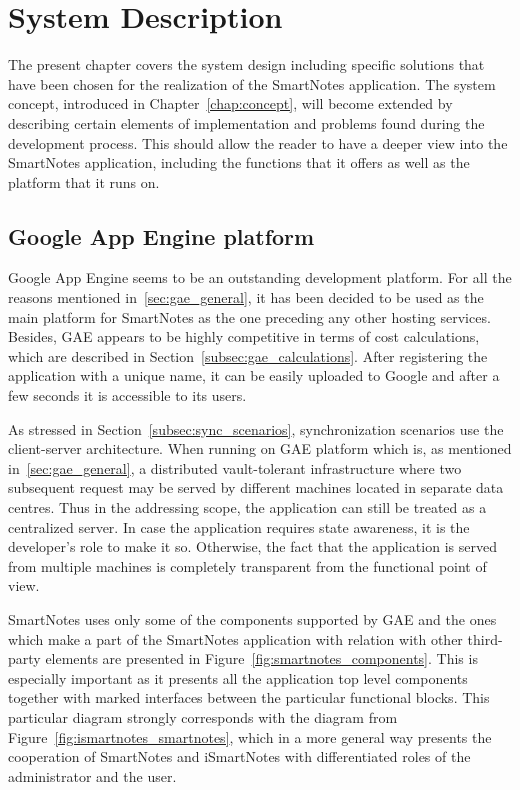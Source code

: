 \chapter{System Description}\label{chap:sys_description}
The present chapter covers the system design including specific solutions that have been chosen for the realization of the SmartNotes application. The system concept, introduced in Chapter~\ref{chap:concept}, will become extended by describing certain elements of implementation and problems found during the development process. This should allow the reader to have a deeper view into the SmartNotes application, including the functions that it offers as well as the platform that it runs on.
\section{Google App Engine platform}\label{sec:gae}
Google App Engine seems to be an outstanding development platform. For all the reasons mentioned in~\ref{sec:gae_general}, it has been decided to be used as the main platform for SmartNotes as the one preceding any other hosting services. Besides, GAE appears to be highly competitive in terms of cost calculations, which are described in Section~\ref{subsec:gae_calculations}. After registering the application with a unique name, it can be easily uploaded to Google and after a few seconds it is accessible to its users.

As stressed in Section~\ref{subsec:sync_scenarios}, synchronization scenarios use the client-server architecture. When running on GAE platform which is, as mentioned in~\ref{sec:gae_general}, a distributed vault-tolerant infrastructure where two subsequent request may be served by different machines located in separate data centres. Thus in the addressing scope, the application can still be treated as a centralized server. In case the application requires state awareness, it is the developer's role to make it so. Otherwise, the fact that the application is served from multiple machines is completely transparent from the functional point of view.

SmartNotes uses only some of the components supported by GAE and the ones which make a part of the SmartNotes application with relation with other third-party elements are presented in Figure~\ref{fig:smartnotes_components}. This is especially important as it presents all the application top level components together with marked interfaces between the particular functional blocks. This particular diagram strongly corresponds with the diagram from Figure~\ref{fig:ismartnotes_smartnotes}, which in a more general way presents the cooperation of SmartNotes and iSmartNotes with differentiated roles of the administrator and the user. 

